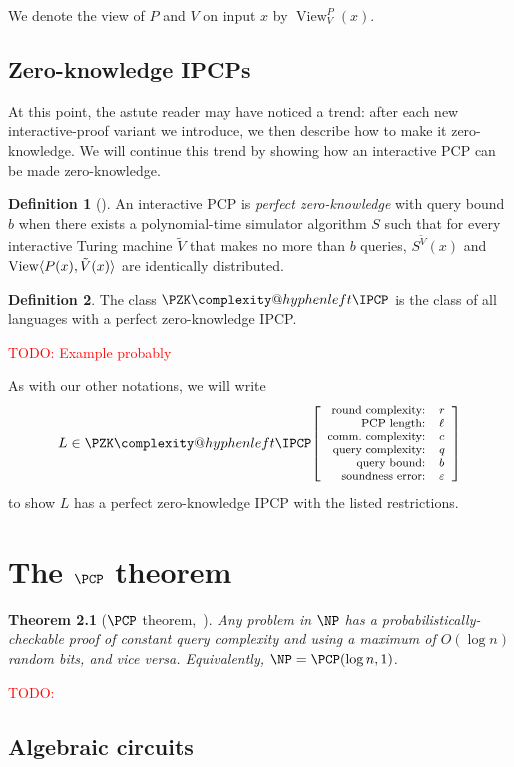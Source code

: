 \documentclass[english,12pt]{reedthesis}
\makeatletter
\theoremstyle{plain}
\newtheorem{thm}{Theorem}[section]
\theoremstyle{definition}
\newtheorem{defn}[defn]{Definition}
\theoremstyle{remark}
\DeclareMathOperator{\View}{View}
\DeclarePairedDelimiter{\ang}{\langle}{\rangle}
\newcommand{\pzkipcp}[6]{%
  \ensuremath%
  \mleft[{\footnotesize\begin{array}{r l}
    \text{round complexity:} & #1 \\
    \text{PCP length:} & #2 \\
    \text{comm.\ complexity:} & #3 \\
    \text{query complexity:} & #4 \\
    \text{query bound:} & #5 \\
    \text{soundness error:} & #6
  \end{array}}\mright]%
}
\newcommand{\PZKIPCP}{%
  \PZK\complexity@hyphenleft\IPCP
}
\newcommand{\TODO}[1]{\textcolor{red}{TODO: #1}}
\makeatother
\begin{document}
We denote the view of $P$ and $V$ on input $x$ by $\View_{V}^{P}(x)$.

\section{Zero-knowledge IPCPs}

At this point, the astute reader may have noticed a trend: after each new
interactive-proof variant we introduce, we then describe how to make it
zero-knowledge. We will continue this trend by showing how an interactive PCP
can be made zero-knowledge.

\begin{defn}[{\cite[]{CFGS22}}]\label{def:zk-ipcp}
  An interactive PCP is \emph{perfect zero-knowledge} with query bound $b$ when
  there exists a polynomial-time simulator algorithm $S$ such that for every
  interactive Turing machine $\tilde{V}$ that makes no more than $b$ queries,
  $S^{\tilde{V}}(x)$ and $\View\ang{P(x), \tilde{V}(x)}$ are identically
  distributed.
\end{defn}

\begin{defn}\label{def:pzkipcp}\index{PZK-IPCP@$\PZKIPCP$}
  The class $\PZKIPCP$ is the class of all languages with a perfect
  zero-knowledge IPCP\@.
\end{defn}

\TODO{Example probably}

As with our other notations, we will write
\[
  L \in \PZKIPCP\pzkipcp{r}{\ell}{c}{q}{b}{\varepsilon}
\]
to show $L$ has a perfect zero-knowledge IPCP with the listed restrictions.

\chapter{The $\PCP$ theorem}\label{chap:pcp-theorem}

\begin{thm}[{$\PCP$ theorem,~\cite{AS98}}]\label{thm:pcp-theorem}
  Any problem in $\NP$ has a probabilistically-checkable proof of constant query
  complexity and using a maximum of $O(\log n)$ random bits, and vice versa.
  Equivalently, $\NP = \PCP(\log n, 1)$.
\end{thm}

\TODO{}

\section{Algebraic circuits}\label{sec:alg-circuit}
\end{document}
